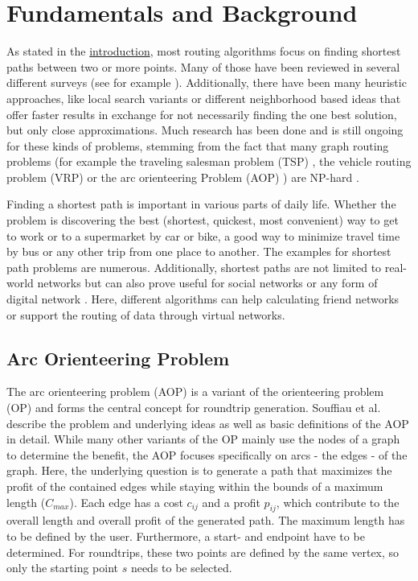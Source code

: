 \chapter{Fundamentals and Background}
\label{chapter:fundamentals}

As stated in the \href{chapter:introduction}{introduction}, most routing algorithms focus on finding shortest paths between two or more points.
Many of those have been reviewed in several different surveys (see for example \cite{madkour_survey_2017, wayahdi_greedy_2021}).
Additionally, there have been many heuristic approaches, like local search variants \cite{braysy_vehicle_2005, irnich_sequential_2006, ropke_heuristic_2005} or different neighborhood based ideas \cite{braysy_vehicle_2005, irnich_sequential_2006, ropke_heuristic_2005} that offer faster results in exchange for not necessarily finding the one best solution, but only close approximations.
Much research has been done and is still ongoing for these kinds of problems, stemming from the fact that many graph routing problems (for example the traveling salesman problem (TSP) \cite{gendreau_handbook_2010}, the vehicle routing problem (VRP)  \cite{braysy_vehicle_2005, irnich_sequential_2006} or the arc orienteering Problem (AOP) \cite{agarwal_correlated_2023, buchin_tour4me_2022}) are NP-hard \cite{reinelt_traveling_2003}.
 
Finding a shortest path is important in various parts of daily life.
Whether the problem is discovering the best (shortest, quickest, most convenient) way to get to work or to a supermarket by car or bike, a good way to minimize travel time by bus or any other trip from one place to another.
The examples for shortest path problems are numerous.
Additionally, shortest paths are not limited to real-world networks but can also prove useful for social networks or any form of digital network \cite{potamias_fast_2009}.
Here, different algorithms can help calculating friend networks or support the routing of data through virtual networks. 

\section{Arc Orienteering Problem}
\label{sec:aop}

The arc orienteering problem (AOP) is a variant of the orienteering problem (OP) and forms the central concept for roundtrip generation.
Souffiau et al.\ \cite{souffriau_planning_2011} describe the problem and underlying ideas as well as basic definitions of the AOP in detail.
While many other variants of the OP mainly use the nodes of a graph to determine the benefit, the AOP focuses specifically on arcs - the edges - of the graph.
Here, the underlying question is to generate a path that maximizes the profit of the contained edges while staying within the bounds of a maximum length ($C_{max}$). 
Each edge has a cost $c_{ij}$ and a profit $p_{ij}$, which contribute to the overall length and overall profit of the generated path.
The maximum length has to be defined by the user.
Furthermore, a start- and endpoint have to be determined.
For roundtrips, these two points are defined by the same vertex, so only the starting point $s$ needs to be selected.


